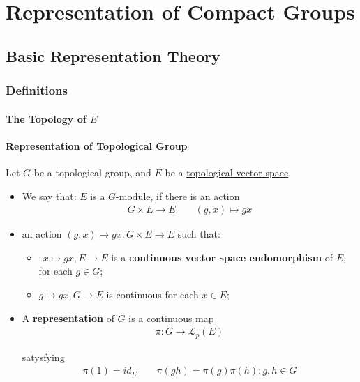 \documentclass[Total.tex]{subfiles}
\begin{document}
	\chapter{Representation of Compact Groups}
		\section{Basic Representation Theory}
			\subsection{Definitions}
			\subsubsection{The Topology of $E$}
			\subsubsection{Representation of Topological Group}
			\begin{Def}
				Let $G$ be a topological group, and $E$ be a \underline{topological vector space}.
				\begin{itemize}
					\item We say that: $E$ is a $G$-module, if there is an action
					\begin{gather*}
						G\times E\rightarrow E\qquad (g,x)\mapsto gx
					\end{gather*}
					\item 
					an action $(g,x)\mapsto gx:G\times E\rightarrow E$ such that:
					\begin{itemize}
						\item $:x\mapsto gx,E\rightarrow E$ is a \textbf{continuous vector space endomorphism} of $E$, for each $g\in G$;
						\item $g\mapsto gx,G\rightarrow E$ is continuous for each $x\in E$;
					\end{itemize}
					\item A \textbf{representation} of $G$ is a continuous map
					\begin{gather*}
						\pi:G\rightarrow \mathcal{L}_p(E)
					\end{gather*}
					
					satysfying
					\begin{gather*}
						\pi(1)=id_E\qquad \pi(gh)=\pi(g)\pi(h);g,h\in G
					\end{gather*}
				\end{itemize}
			\end{Def}
			
\end{document}
